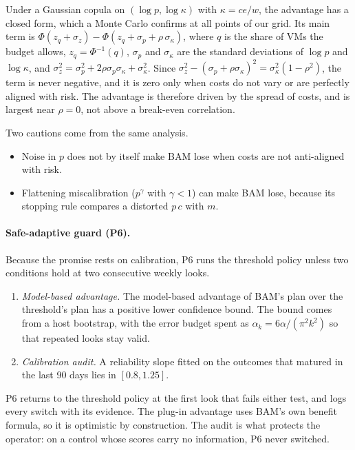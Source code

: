 Under a Gaussian copula on $(\log p, \log\kappa)$ with $\kappa = c e / w$, the advantage has a
closed form, which a Monte Carlo confirms at all \VTheoryPoints{} points of our grid. Its main term is
$\Phi(z_q + \sigma_z) - \Phi(z_q + \sigma_p + \rho\,\sigma_\kappa)$, where $q$ is the share of VMs the
budget allows, $z_q = \Phi^{-1}(q)$, $\sigma_p$ and $\sigma_\kappa$ are the standard deviations of $\log p$
and $\log\kappa$, and $\sigma_z^2 = \sigma_p^2 + 2\rho\sigma_p\sigma_\kappa + \sigma_\kappa^2$. Since
$\sigma_z^2 - (\sigma_p + \rho\sigma_\kappa)^2 = \sigma_\kappa^2(1-\rho^2)$, the term is never negative, and it is
zero only when costs do not vary or are perfectly aligned with risk. The advantage is therefore
driven by the spread of costs, and is largest near $\rho = 0$, not above a break-even correlation.

Two cautions come from the same analysis.
\begin{itemize}
  \item Noise in $p$ does not by itself make BAM lose when costs are not anti-aligned with risk.
  \item Flattening miscalibration ($p^{\gamma}$ with $\gamma < 1$) can make BAM lose, because its
  stopping rule compares a distorted $p\,c$ with $m$.
\end{itemize}

\paragraph{Safe-adaptive guard (P6).}
Because the promise rests on calibration, P6 runs the threshold policy unless two conditions hold
at two consecutive weekly looks.
\begin{enumerate}
  \item \emph{Model-based advantage.} The model-based advantage of BAM's plan over the threshold's
  plan has a positive lower confidence bound. The bound comes from a host bootstrap, with the
  error budget spent as $\alpha_k = 6\alpha/(\pi^2 k^2)$ so that repeated looks stay valid.
  \item \emph{Calibration audit.} A reliability slope fitted on the outcomes that matured in the
  last 90 days lies in $[0.8, 1.25]$.
\end{enumerate}
P6 returns to the threshold policy at the first look that fails either test, and logs every switch
with its evidence. The plug-in advantage uses BAM's own benefit formula, so it is optimistic by
construction. The audit is what protects the operator: on a control whose scores carry no
information, P6 never switched.
